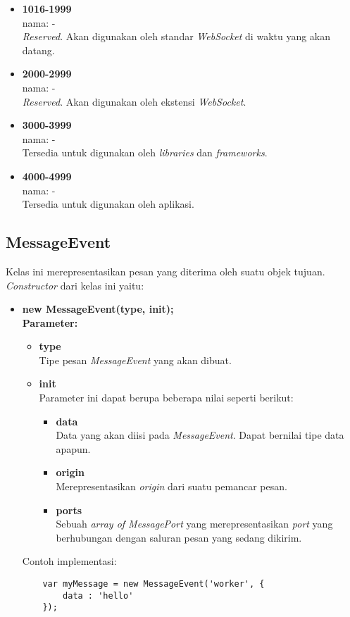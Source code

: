 \begin{itemize}
	\item \textbf{1016-1999} \\ nama: - \\ \textit{Reserved}. Akan digunakan oleh standar \textit{WebSocket} di waktu yang akan datang.
	
	\item \textbf{2000-2999} \\ nama: - \\ \textit{Reserved}. Akan digunakan oleh ekstensi \textit{WebSocket}.
	
	\item \textbf{3000-3999} \\ nama: - \\ Tersedia untuk digunakan oleh \textit{libraries} dan \textit{frameworks}.
	
	\item \textbf{4000-4999} \\ nama: - \\ Tersedia untuk digunakan oleh aplikasi.
\end{itemize}

\subsection{MessageEvent}
Kelas ini merepresentasikan pesan yang diterima oleh suatu objek tujuan. \textit{Constructor} dari kelas ini yaitu: 
\begin{itemize}
	\item \textbf{new MessageEvent(type, init);} \\
	\textbf{Parameter:}
	\begin{itemize}
		\item \textbf{type} \\ Tipe pesan \textit{MessageEvent} yang akan dibuat.
		\item \textbf{init} \\ Parameter ini dapat berupa beberapa nilai seperti berikut:
		\begin{itemize}
			\item \textbf{data} \\ Data yang akan diisi pada \textit{MessageEvent}. Dapat bernilai tipe data apapun.
			\item \textbf{origin} \\ Merepresentasikan \textit{origin} dari suatu pemancar pesan.
			\item \textbf{ports} \\ Sebuah \textit{array of MessagePort} yang merepresentasikan \textit{port} yang berhubungan dengan saluran pesan yang sedang dikirim.
		\end{itemize}
	\end{itemize}
	Contoh implementasi:
	\begin{lstlisting}
	var myMessage = new MessageEvent('worker', {
		data : 'hello'
	});
	\end{lstlisting}
\end{itemize}


